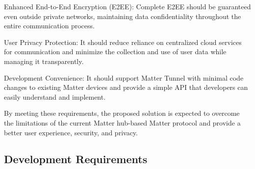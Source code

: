 \documentclass[conference]{IEEEtran}
\begin{document}
Enhanced End-to-End Encryption (E2EE): Complete E2EE should be guaranteed even outside private networks, maintaining data confidentiality throughout the entire communication process.

User Privacy Protection: It should reduce reliance on centralized cloud services for communication and minimize the collection and use of user data while managing it transparently.

Development Convenience: It should support Matter Tunnel with minimal code changes to existing Matter devices and provide a simple API that developers can easily understand and implement.

By meeting these requirements, the proposed solution is expected to overcome the limitations of the current Matter hub-based Matter protocol and provide a better user experience, security, and privacy.

\subsection{Development Requirements}
\end{document}
